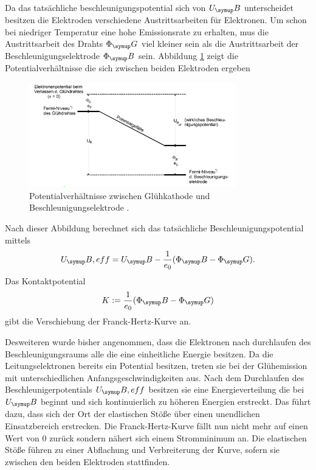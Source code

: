 Da das tatsächliche beschleunigungspotential sich von $U_\su{B}$ unterscheidet
besitzen die Elektroden verschiedene Austrittsarbeiten für Elektronen.
Um schon bei niedriger Temperatur eine hohe Emissionsrate zu erhalten, mus die
Austrittsarbeit des Drahts $\Phi_\su{G}$ viel kleiner sein als die
Austrittsarbeit der Beschleunigungselektrode $\Phi_\su{B}$ sein.
Abbildung \ref{fig:pot} zeigt die Potentialverhältnisse die sich zwischen beiden
Elektroden ergeben
\begin{figure}
  \centering
  \includegraphics[width=0.8\textwidth]{bilder/potential.pdf}
  \caption{Potentialverhältnisse zwischen Glühkathode und Beschleunigungselektrode
  \cite{601}.}
  \label{fig:pot}
\end{figure}
Nach dieser Abbildung berechnet sich das tatsächliche Beschleunigungspotential
mittels
\begin{equation}
  U_\su{B,eff}=U_\su{B}-\frac{1}{e_0}(\Phi_\su{B}-\Phi_\su{G}).
\end{equation}
Das Kontaktpotential
\begin{equation}
  K:= \frac{1}{e_0}(\Phi_\su{B}-\Phi_\su{G})
\end{equation}
gibt die Verschiebung der Franck-Hertz-Kurve an.

Desweiteren wurde bisher angenommen, dass die Elektronen nach durchlaufen des
Beschleunigungsraums alle die eine einheitliche Energie besitzen. Da die
Leitungselektronen bereits ein Potential besitzen, treten sie bei der
Glühemission mit unterschiedlichen Anfangsgeschwindigkeiten aus. Nach dem
Durchlaufen des Beschleunigerpotentials $U_\su{B,eff}$ besitzen sie eine
Energieverteilung die bei $U_\su{B}$ beginnt und sich kontinuierlich zu
höheren Energien erstreckt. Das führt dazu, dass sich der Ort der elastischen
Stöße über einen unendlichen Einsatzbereich erstrecken. Die Franck-Hertz-Kurve
fällt nun nicht mehr auf einen Wert von 0 zurück sondern nähert sich einem
Stromminimum an. Die elastischen Stöße führen zu einer Abflachung und Verbreiterung
der Kurve, sofern sie zwischen den beiden Elektroden stattfinden.

